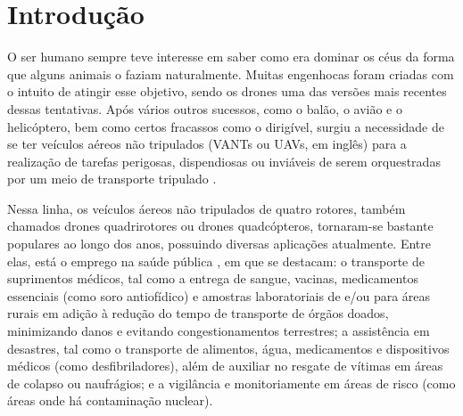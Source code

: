 \section{Introdução}

O ser humano sempre teve interesse em saber como era dominar os céus da forma que alguns animais o faziam 
naturalmente. Muitas engenhocas foram criadas com o intuito de atingir esse objetivo, sendo os drones uma das 
versões mais recentes dessas tentativas. Após vários outros sucessos, como o balão, o avião e o helicóptero, bem 
como certos fracassos como o dirigível, surgiu a necessidade de se ter veículos aéreos não tripulados (VANTs ou 
UAVs, em inglês) para a realização de tarefas perigosas, dispendiosas ou inviáveis de serem orquestradas por um 
meio de transporte tripulado \cite{ita}.

Nessa linha, os veículos áereos não tripulados de quatro rotores, também chamados drones quadrirotores ou drones 
quadcópteros, tornaram-se bastante populares ao longo dos anos, possuindo diversas aplicações atualmente. Entre 
elas, está o emprego na saúde pública \cite{drone_medico}, em que se destacam: o transporte de suprimentos médicos, 
tal como a entrega de sangue, vacinas, medicamentos essenciais (como soro antiofídico) e amostras laboratoriais de 
e/ou para áreas rurais em adição à redução do tempo de transporte de órgãos doados, minimizando danos e evitando 
congestionamentos terrestres; a assistência em desastres, tal como o transporte de alimentos, água, medicamentos e 
dispositivos médicos (como desfibriladores), além de auxiliar no resgate de vítimas em áreas de colapso ou 
naufrágios; e a vigilância e monitoriamente em áreas de risco (como áreas onde há contaminação nuclear).